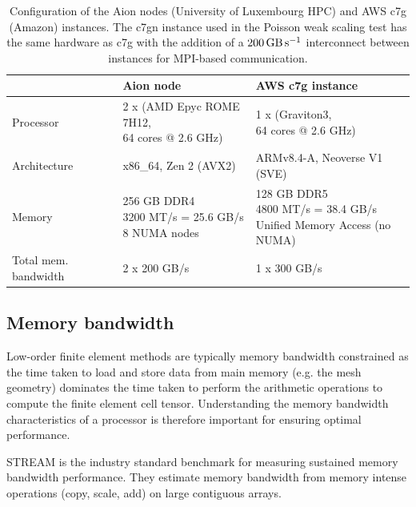 \begin{table}
  \footnotesize
  \renewcommand{\arraystretch}{1.5}
  \begin{tabular}{l|l|l}
                              & Aion node                                                          & AWS c7g instance \\ \hline \hline
    Processor                 & \makecell[l]{2 x (AMD Epyc ROME 7H12, \\ 64 cores @ 2.6 GHz)}      & \makecell[l]{1 x (Graviton3, \\ 64 cores @ 2.6 GHz)} \\ \hline
    Architecture              & x86\_64, Zen 2 (AVX2)                                              & ARMv8.4-A, Neoverse V1 (SVE) \\ \hline
    Memory                    & \makecell[l]{256 GB DDR4 \\ 3200 MT/s = 25.6 GB/s \\ 8 NUMA nodes} & \makecell[l]{128 GB DDR5 \\ 4800 MT/s = 38.4 GB/s  \\ Unified Memory Access (no NUMA) } \\ \hline
    Total mem. bandwidth      & 2 x 200 GB/s                                                       & 1 x 300 GB/s  \\ \hline
  \end{tabular}
  \vspace{5pt}
  \caption{Configuration of the Aion nodes (University of Luxembourg HPC) and
	AWS c7g (Amazon) instances. The c7gn instance used in the Poisson weak
	scaling test has the same hardware as c7g with the addition of a
	$\SI{200}{\giga\byte\per\second}$ interconnect between instances for
	MPI-based communication.}
  \label{tab:aion-aws-config}
\end{table}

\subsection*{Memory bandwidth}

Low-order finite element methods are typically memory bandwidth constrained as
the time taken to load and store data from main memory (e.g. the mesh geometry)
dominates the time taken to perform the arithmetic operations to compute the
finite element cell tensor. Understanding the memory bandwidth characteristics
of a processor is therefore important for ensuring optimal performance.

STREAM \citep{McCalpin1995,McCalpin2007} is the industry standard benchmark for
measuring sustained memory bandwidth performance. They estimate memory bandwidth
from memory intense operations (copy, scale, add) on large contiguous arrays.

